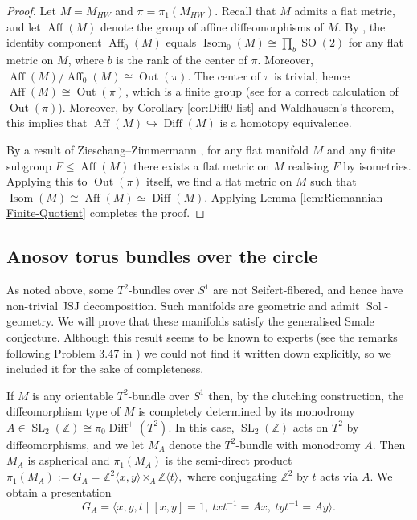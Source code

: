 \documentclass{amsart}
\theoremstyle{plain}
\theoremstyle{definition}
\DeclareMathOperator\Diff{Diff}
\DeclareMathOperator\Isom{Isom}
\DeclareMathOperator\Aff{Aff}
\DeclareMathOperator\SO{SO}
\DeclareMathOperator\SL{SL}
\DeclareMathOperator\Sol{Sol}
\DeclareMathOperator{\Out}{Out}
\newcommand{\Z}{\mathbb{Z}}
\begin{document}
\begin{proof}
    Let $M=M_{HW}$ and $\pi=\pi_1(M_{HW})$. Recall that $M$ admits a flat metric, and let $\Aff(M)$ denote the group of affine diffeomorphisms of $M$.  By \cite[Theorem 1,  p474]{CharlapVasquez}, the identity component $\Aff_0(M)$ equals $\Isom_0(M)\cong \prod_b \SO(2)$ for any flat metric on $M$, where $b$ is the rank of the center of $\pi$. Moreover, $\Aff(M)/\Aff_0(M)\cong \Out(\pi)$. The center of $\pi$ is trivial, hence $\Aff(M)\cong \Out(\pi)$, which is a finite group \cite[Example 1]{CharlapVasquez} (see \cite{ZimmermannHW} for a correct calculation of $\Out(\pi)$). Moreover, by Corollary \ref{cor:Diff0-list} and Waldhausen's theorem, this implies that $\Aff(M)\hookrightarrow \Diff(M)$ is a homotopy equivalence. 
    
    By a result of Zieschang--Zimmermann \cite[Satz 3.17]{ZieschangZimmermann}, for any flat manifold $M$ and any finite subgroup $F\leq\Aff(M)$ there exists a flat metric on $M$ realising $F$ by isometries.  Applying this to $\Out(\pi)$ itself, we find a flat metric on $M$ such that $\Isom(M)\cong \Aff(M)\simeq \Diff(M)$. Applying Lemma \ref{lem:Riemannian-Finite-Quotient} completes the proof.
\end{proof}



 
 \subsection{Anosov torus bundles over the circle}
 As noted above, some $T^2$-bundles over $S^1$ are not Seifert-fibered, and hence have non-trivial JSJ decomposition. Such manifolds are geometric and admit $\Sol$-geometry. 
 We will prove that these manifolds satisfy the generalised Smale conjecture. Although this result seems to be known to experts (see the remarks following Problem 3.47 in \cite{KirbyProblems})  we could not find it written down explicitly, so we included it for the sake of completeness.  

 If $M$ is any orientable $T^2$-bundle over $S^1$ then, by the  clutching construction, the diffeomorphism type of $M$ is completely determined by its monodromy $A\in  \SL_2(\Z)\cong \pi_0\Diff^+(T^2)$. In this case, $\SL_2(\Z)$ acts on $T^2$ by diffeomorphisms, and we let $M_A$ denote the $T^2$-bundle with monodromy $A$. Then $M_A$ is aspherical and $\pi_1(M_A)$ is the semi-direct product $\pi_1(M_A):=G_A=\Z^2\langle x,y\rangle\rtimes_A\Z\langle t\rangle,$ where conjugating $\Z^2$ by $t$ acts via $A$.  We obtain a presentation
 \begin{equation}\label{eqn:Torus-bundle}
     G_A=\langle x,y,t\mid [x,y]=1,~txt^{-1}=Ax,~tyt^{-1}=Ay\rangle.
 \end{equation}
\end{document}
